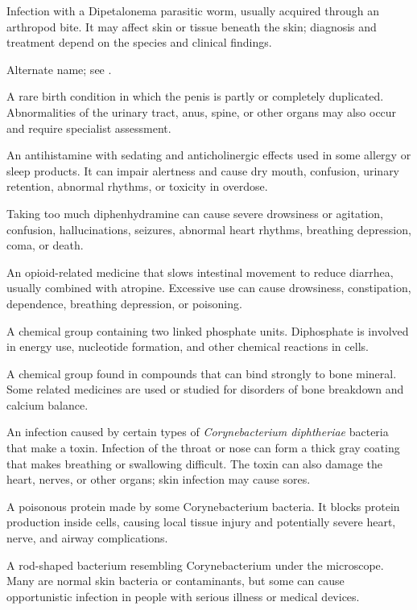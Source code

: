  Infection with a Dipetalonema parasitic worm, usually acquired through an arthropod bite. It may affect skin or tissue beneath the skin; diagnosis and treatment depend on the species and clinical findings.

 Alternate name; see .

 A rare birth condition in which the penis is partly or completely duplicated. Abnormalities of the urinary tract, anus, spine, or other organs may also occur and require specialist assessment.

 An antihistamine with sedating and anticholinergic effects used in some allergy or sleep products. It can impair alertness and cause dry mouth, confusion, urinary retention, abnormal rhythms, or toxicity in overdose.

 Taking too much diphenhydramine can cause severe drowsiness or agitation, confusion, hallucinations, seizures, abnormal heart rhythms, breathing depression, coma, or death.

 An opioid-related medicine that slows intestinal movement to reduce diarrhea, usually combined with atropine. Excessive use can cause drowsiness, constipation, dependence, breathing depression, or poisoning.

 A chemical group containing two linked phosphate units. Diphosphate is involved in energy use, nucleotide formation, and other chemical reactions in cells.

 A chemical group found in compounds that can bind strongly to bone mineral. Some related medicines are used or studied for disorders of bone breakdown and calcium balance.

 An infection caused by certain types of \textit{Corynebacterium diphtheriae} bacteria that make a toxin. Infection of the throat or nose can form a thick gray coating that makes breathing or swallowing difficult. The toxin can also damage the heart, nerves, or other organs; skin infection may cause sores.

 A poisonous protein made by some Corynebacterium bacteria. It blocks protein production inside cells, causing local tissue injury and potentially severe heart, nerve, and airway complications.

 A rod-shaped bacterium resembling Corynebacterium under the microscope. Many are normal skin bacteria or contaminants, but some can cause opportunistic infection in people with serious illness or medical devices.

